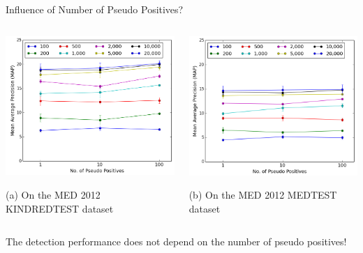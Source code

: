 \documentclass{beamer}
\begin{document}
\begin{frame}[t]{Influence of Number of Pseudo Positives?}
\bigskip

\begin{columns}
  \begin{column}{0.5\textwidth}
    \centerline{\includegraphics[width=1\textwidth]{images/p_exp3.png}}
    (a) On the MED 2012 KINDREDTEST dataset
  \end{column}

  \begin{column}{0.5\textwidth}
    \centerline{\includegraphics[width=1\textwidth]{images/p_exp3_mt.png}}
    (b) On the MED 2012 MEDTEST dataset
  \end{column}
\end{columns}
\bigskip

The detection performance does not depend on the number of pseudo positives!

\end{frame}
\end{document}
